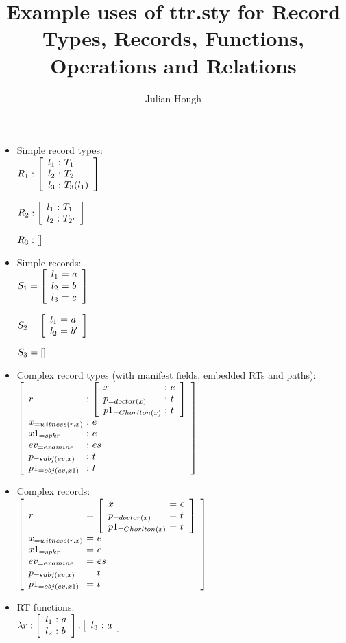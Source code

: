 \documentclass[12pt]{article}
\title{Example uses of ttr.sty for Record Types, Records, Functions, Operations and Relations}
\author{Julian Hough}
\begin{document}
\maketitle

\begin{itemize}
\item Simple record types:\\
$R_1:\ttrrectype{l_1 & T_1 \\ l_2& T_2 \\ l_3 & T_3(l_1)}$

$R_2:\ttrrectype{l_1 & T_1 \\ l_2 & T_{2'}}$

$R_3:\ttrrectype{}$

\item Simple records:\\
$S_1 = \ttrrec{l_1 & a \\ l_2& b \\ l_3 & c}$  

$S_2 = \ttrrec{l_1 & a \\ l_2 & b'}$

$S_3 = \ttrrec{}$

\item Complex record types (with manifest fields, embedded RTs and paths):\\

$\ttrrectype{r&\ttrrectype{x&e\\p_{=doctor(x)}&t\\p1_{=Chorlton(x)}&t}\\x_{=witness(r.x)}&e\\x1_{=spkr}&e\\ev_{=examine}&es\\p_{=subj(ev,x)}&t\\p1_{=obj(ev,x1)}&t}$
\item Complex records:\\
$\ttrrec{r&\ttrrec{x&e\\p_{=doctor(x)}&t\\p1_{=Chorlton(x)}&t}\\x_{=witness(r.x)}&e\\x1_{=spkr}&e\\ev_{=examine}&es\\p_{=subj(ev,x)}&t\\p1_{=obj(ev,x1)}&t}$

\item RT functions:\\
$\ttrlambda{r}{l_1 & a\\l_2 & b}{l_3 & a}$


\end{itemize}
\end{document}
